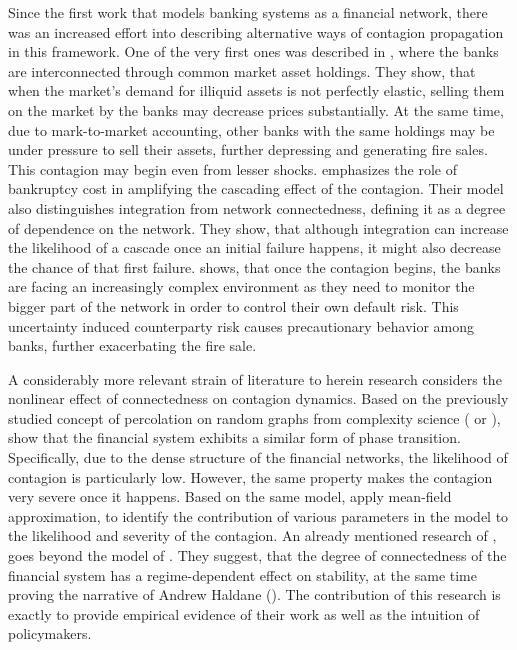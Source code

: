 \documentclass[12pt]{article}
\begin{document}
Since the first work that models banking systems as a financial network, there was an increased effort into describing alternative ways of contagion propagation in this framework. One of the very first ones was described in \cite{cifuentes05}, where the banks are interconnected through common market asset holdings. They show, that when the market's demand for illiquid assets is not perfectly elastic, selling them on the market by the banks may decrease prices substantially. At the same time, due to mark-to-market accounting, other banks with the same holdings may be under pressure to sell their assets, further depressing and generating fire sales. This contagion may begin even from lesser shocks. \citet{elliot14} emphasizes the role of bankruptcy cost in amplifying the cascading effect of the contagion. Their model also distinguishes integration from network connectedness, defining it as a degree of dependence on the network. They show, that although integration can increase the likelihood of a cascade once an initial failure happens, it might also decrease the chance of that first failure. \cite{caballero13} shows, that once the contagion begins, the banks are facing an increasingly complex environment as they need to monitor the bigger part of the network in order to control their own default risk. This uncertainty induced counterparty risk causes precautionary behavior among banks, further exacerbating the fire sale.

A considerably more relevant strain of literature to herein research considers the nonlinear effect of connectedness on contagion dynamics. Based on the previously studied concept of percolation on random graphs from complexity science (\cite{callaway00} or \cite{newman001}), \cite{gai10} show that the financial system exhibits a similar form of phase transition. Specifically, due to the dense structure of the financial networks, the likelihood of contagion is particularly low. However, the same property makes the contagion very severe once it happens. Based on the same model, \cite{may10} apply mean-field approximation, to identify the contribution of various parameters in the model to the likelihood and severity of the contagion. An already mentioned research of \cite{acemoglu13}, goes beyond the model of \cite{gai10}. They suggest, that the degree of connectedness of the financial system has a regime-dependent effect on stability, at the same time proving the narrative of Andrew Haldane (\cite{haldane13}). The contribution of this research is exactly to provide empirical evidence of their work as well as the intuition of policymakers.  
\end{document}
